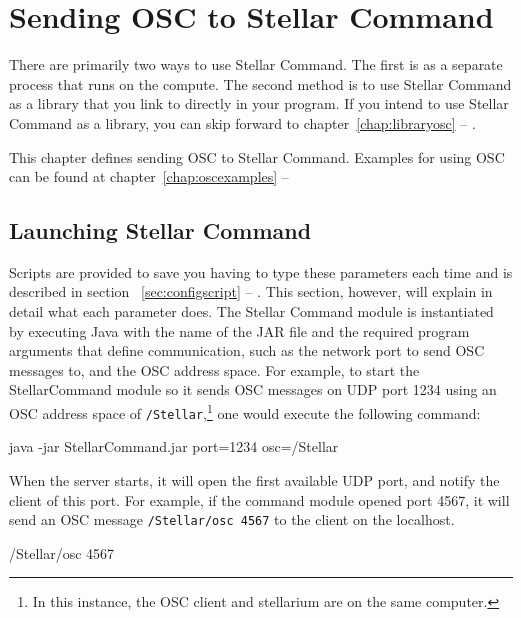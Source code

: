 \chapter{Sending OSC to Stellar Command} \label{chap:launchosc}
There are primarily two ways to use Stellar Command. The first is as a separate process that runs on the compute. The second method is to use Stellar Command as a library that you link to directly in your program. If you intend to use Stellar Command as a library, you can skip forward to chapter~\ref{chap:libraryosc} --
\emph{}. 

This chapter defines sending OSC to Stellar Command.  Examples for using OSC can be found at 
chapter~\ref{chap:oscexamples} --
\emph{}


\section{Launching Stellar Command} \label{sec:launchcommand}
Scripts are provided to save you having to type these parameters each time and is described in section ~\ref{sec:configscript} --
\emph{}. This section, however, will explain in detail what each parameter does.
The Stellar Command module is instantiated by executing Java  with the name of the JAR file and the required program arguments that define communication, such as the network port to send OSC messages to, and the OSC address space.  
For example, to start the StellarCommand module so it sends OSC messages on UDP port 1234  using an OSC address space of \texttt{/Stellar},\footnote{In this instance, the OSC client and stellarium are on the same computer.} one would execute the following command:\\

\begin{syntax}  
\medskip
	java -jar StellarCommand.jar port=1234 osc=/Stellar  \\
\medskip
\end{syntax}
\bigskip
   When the server starts, it will open the first available UDP port, and notify the client of this port. For example, if the command module opened port 4567, it will send an OSC message \texttt{/Stellar/osc 4567} to the client on the localhost. 
   
\begin{syntax}
\medskip
	/Stellar/osc 4567  \\
\medskip
\end{syntax}
\bigskip

